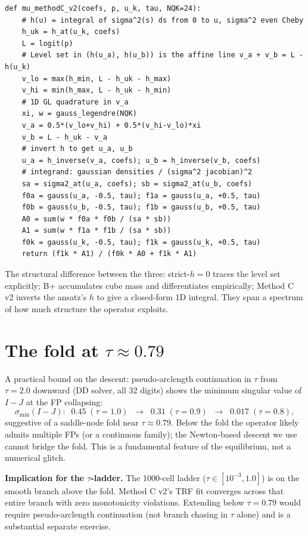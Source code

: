 \documentclass[11pt]{article}
\begin{document}
\begin{verbatim}
def mu_methodC_v2(coefs, p, u_k, tau, NQK=24):
    # h(u) = integral of sigma^2(s) ds from 0 to u, sigma^2 even Cheby
    h_uk = h_at(u_k, coefs)
    L = logit(p)
    # Level set in (h(u_a), h(u_b)) is the affine line v_a + v_b = L - h(u_k)
    v_lo = max(h_min, L - h_uk - h_max)
    v_hi = min(h_max, L - h_uk - h_min)
    # 1D GL quadrature in v_a
    xi, w = gauss_legendre(NQK)
    v_a = 0.5*(v_lo+v_hi) + 0.5*(v_hi-v_lo)*xi
    v_b = L - h_uk - v_a
    # invert h to get u_a, u_b
    u_a = h_inverse(v_a, coefs); u_b = h_inverse(v_b, coefs)
    # integrand: gaussian densities / (sigma^2 jacobian)^2
    sa = sigma2_at(u_a, coefs); sb = sigma2_at(u_b, coefs)
    f0a = gauss(u_a, -0.5, tau); f1a = gauss(u_a, +0.5, tau)
    f0b = gauss(u_b, -0.5, tau); f1b = gauss(u_b, +0.5, tau)
    A0 = sum(w * f0a * f0b / (sa * sb))
    A1 = sum(w * f1a * f1b / (sa * sb))
    f0k = gauss(u_k, -0.5, tau); f1k = gauss(u_k, +0.5, tau)
    return (f1k * A1) / (f0k * A0 + f1k * A1)
\end{verbatim}

The structural difference between the three: strict-$h{=}0$ traces the
level set explicitly; B+ accumulates cube mass and differentiates
empirically; Method C v2 inverts the ansatz's $h$ to give a closed-form
1D integral. They span a spectrum of how much structure the operator
exploits.

\section{The fold at $\tau \approx 0.79$}

A practical bound on the descent: pseudo-arclength continuation in
$\tau$ from $\tau = 2.0$ downward (DD solver, all 32 digits) shows the
minimum singular value of $I - J$ at the FP collapsing:
\[
  \sigma_{\min}(I - J) :\;\; 0.45\; (\tau=1.0)\;\; \to\;\; 0.31\; (\tau=0.9)\;\; \to\;\; 0.017\; (\tau=0.8),
\]
suggestive of a saddle-node fold near $\tau \approx 0.79$. Below the
fold the operator likely admits multiple FPs (or a continuous family);
the Newton-based descent we use cannot bridge the fold. This is a
fundamental feature of the equilibrium, not a numerical glitch.

\textbf{Implication for the $\tau$-ladder.} The 1000-cell ladder
($\tau \in [10^{-3}, 1.0]$) is on the smooth branch above the fold.
Method C v2's TRF fit converges across that entire branch with zero
monotonicity violations. Extending below $\tau = 0.79$ would require
pseudo-arclength continuation (not branch chasing in $\tau$ alone)
and is a substantial separate exercise.
\end{document}
